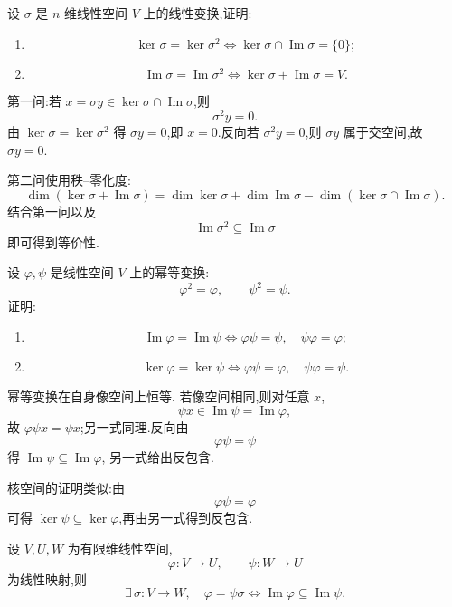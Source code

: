\begin{example}
设 $\sigma$ 是 $n$ 维线性空间 $V$ 上的线性变换,证明:
\begin{enumerate}
    \item
    \[
    \ker\sigma=\ker\sigma^2
    \iff
    \ker\sigma\cap\operatorname{Im}\sigma=\{0\};
    \]
    \item
    \[
    \operatorname{Im}\sigma=\operatorname{Im}\sigma^2
    \iff
    \ker\sigma+\operatorname{Im}\sigma=V.
    \]
\end{enumerate}
\end{example}
\exampleblank

\begin{solution}
第一问:若 $x=\sigma y\in\ker\sigma\cap\operatorname{Im}\sigma$,则
\[
\sigma^2y=0.
\]
由 $\ker\sigma=\ker\sigma^2$ 得 $\sigma y=0$,即 $x=0$.反向若
$\sigma^2y=0$,则 $\sigma y$ 属于交空间,故 $\sigma y=0$.

第二问使用秩--零化度:
\[
\dim(\ker\sigma+\operatorname{Im}\sigma)
=
\dim\ker\sigma+\dim\operatorname{Im}\sigma
-\dim(\ker\sigma\cap\operatorname{Im}\sigma).
\]
结合第一问以及
\[
\operatorname{Im}\sigma^2\subseteq\operatorname{Im}\sigma
\]
即可得到等价性.
\end{solution}


\begin{example}
设 $\varphi,\psi$ 是线性空间 $V$ 上的幂等变换:
\[
\varphi^2=\varphi,\qquad
\psi^2=\psi.
\]
证明:
\begin{enumerate}
    \item
    \[
    \operatorname{Im}\varphi=\operatorname{Im}\psi
    \iff
    \varphi\psi=\psi,\quad\psi\varphi=\varphi;
    \]
    \item
    \[
    \ker\varphi=\ker\psi
    \iff
    \varphi\psi=\varphi,\quad\psi\varphi=\psi.
    \]
\end{enumerate}
\end{example}
\exampleblank

\begin{solution}
幂等变换在自身像空间上恒等.
若像空间相同,则对任意 $x$,
\[
\psi x\in\operatorname{Im}\psi=\operatorname{Im}\varphi,
\]
故 $\varphi\psi x=\psi x$;另一式同理.反向由
\[
\varphi\psi=\psi
\]
得 $\operatorname{Im}\psi\subseteq\operatorname{Im}\varphi$,
另一式给出反包含.

核空间的证明类似:由
\[
\varphi\psi=\varphi
\]
可得 $\ker\psi\subseteq\ker\varphi$,再由另一式得到反包含.
\end{solution}


\begin{proposition}[\markstar]
设 $V,U,W$ 为有限维线性空间,
\[
\varphi:V\to U,\qquad
\psi:W\to U
\]
为线性映射,则
\[
\exists\,\sigma:V\to W,\quad\varphi=\psi\sigma
\iff
\operatorname{Im}\varphi\subseteq\operatorname{Im}\psi.
\]
\end{proposition}


